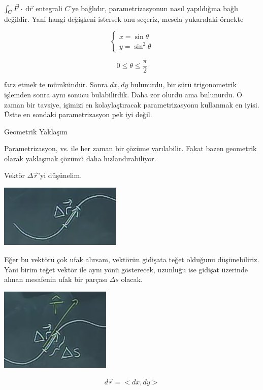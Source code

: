 \documentclass[12pt,fleqn]{article}\usepackage{../../common}
\begin{document}
$\int_C \vec{F} \cdot \,\mathrm{d} \vec{r}$ entegrali $C$'ye bağlıdır, parametrizasyonun
nasıl yapıldığına bağlı değildir. Yani hangi değişkeni istersek onu seçeriz,
mesela yukarıdaki örnekte

$$ 
\left\{ \begin{array}{l}
x  = \sin\theta \\
y  = \sin^2\theta 
\end{array} \right.
$$

$$ 0 \le \theta \le \frac{\pi}{2} $$

farz etmek te mümkündür. Sonra $dx,dy$ bulunurdu, bir sürü trigonometrik
işlemden sonra aynı sonucu bulabilirdik. Daha zor olurdu ama bulunurdu. O
zaman bir tavsiye, işimizi en kolaylaştıracak parametrizasyonu kullanmak en
iyisi. Üstte en sondaki parametrizasyon pek iyi değil. 

Geometrik Yaklaşım

Parametrizasyon, vs. ile her zaman bir çözüme varılabilir. Fakat bazen
geometrik olarak yaklaşmak çözümü daha hızlandırabiliyor. 

Vektör $\Delta \vec{r}$'yi düşünelim. 

\begin{center}
\includegraphics[height=3cm]{19_11.png}
\end{center}

Eğer bu vektörü çok ufak alırsam, vektörün gidişata teğet olduğunu
düşünebiliriz. Yani birim teğet vektör ile aynı yönü gösterecek, uzunluğu
ise gidişat üzerinde alınan mesafenin ufak bir parçası $\Delta s$ olacak. 

\begin{center}
\includegraphics[height=4cm]{19_12.png}
\end{center}

$$ d\vec{r} = <dx, dy> $$
 
\end{document}

